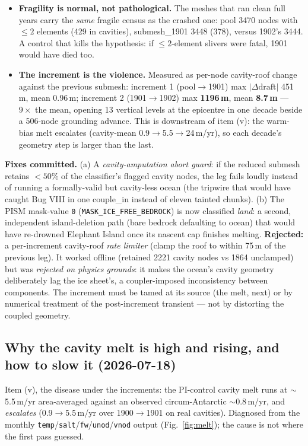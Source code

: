 \documentclass[11pt,a4paper]{article}
\newcommand{\code}[1]{\texttt{\small #1}}
\begin{document}
\begin{itemize}
\item \textbf{Fragility is normal, not pathological.} The meshes that ran clean full years
  carry the \emph{same} fragile census as the crashed one: pool 3470 nodes with $\le2$
  elements (429 in cavities), submesh\_1901 3448 (378), versus 1902's 3444. A control that
  kills the hypothesis: if $\le2$-element slivers were fatal, 1901 would have died too.
\item \textbf{The increment is the violence.} Measured as per-node cavity-roof change against
  the previous submesh: increment 1 (pool$\to$1901) max $|\Delta\mathrm{draft}|$ 451\,m,
  mean 0.96\,m; increment 2 (1901$\to$1902) max \textbf{1196\,m}, mean \textbf{8.7\,m}
  --- $9\times$ the mean, opening 13 vertical levels at the epicentre in one decade beside a
  506-node grounding advance. This is downstream of item (v): the warm-bias melt escalates
  (cavity-mean 0.9$\to$5.5$\to$24\,m/yr), so each decade's geometry step is larger than the
  last.
\end{itemize}

\textbf{Fixes committed.} (a) A \emph{cavity-amputation abort guard}: if the reduced submesh
retains $<50\%$ of the classifier's flagged cavity nodes, the leg fails loudly instead of
running a formally-valid but cavity-less ocean (the tripwire that would have caught Bug VIII
in one couple\_in instead of eleven tainted chunks). (b) The PISM mask-value \code{0}
(\code{MASK\_ICE\_FREE\_BEDROCK}) is now classified \emph{land}: a second, independent
island-deletion path (bare bedrock defaulting to ocean) that would have re-drowned Elephant
Island once its nascent cap finishes melting. \textbf{Rejected:} a per-increment cavity-roof
\emph{rate limiter} (clamp the roof to within 75\,m of the previous leg). It worked offline
(retained 2221 cavity nodes vs 1864 unclamped) but was \emph{rejected on physics grounds}:
it makes the ocean's cavity geometry deliberately lag the ice sheet's, a coupler-imposed
inconsistency between components. The increment must be tamed at its source (the melt, next)
or by numerical treatment of the post-increment transient --- not by distorting the coupled
geometry.

\subsection{Why the cavity melt is high and rising, and how to slow it (2026-07-18)}\label{sec:melt2}

Item (v), the disease under the increments: the PI-control cavity melt runs at
$\sim$5.5\,m/yr area-averaged against an observed circum-Antarctic $\sim$0.8\,m/yr, and
\emph{escalates} (0.9$\to$5.5\,m/yr over 1900$\to$1901 on real cavities). Diagnosed from
the monthly \code{temp}/\code{salt}/\code{fw}/\code{unod}/\code{vnod} output
(Fig.~\ref{fig:melt}); the cause is not where the first pass guessed.
\end{document}
